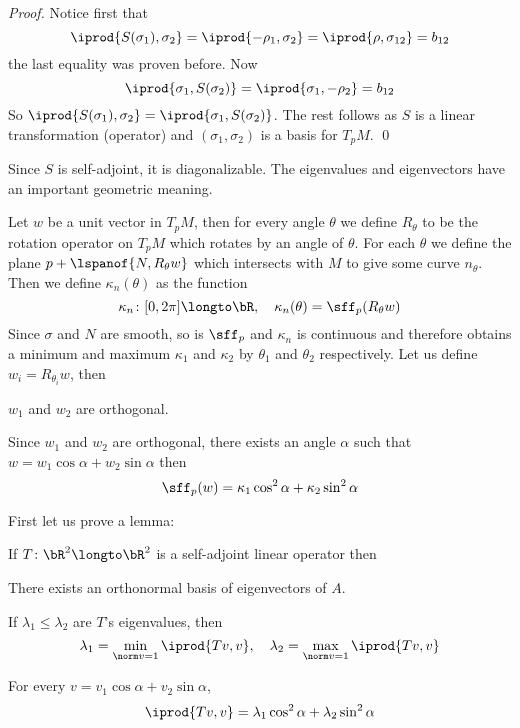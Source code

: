 \begin{proof}

    Notice first that
    \[ \iprod{S(\sigma_1),\sigma_2} = \iprod{-\rho_1,\sigma_2} = \iprod{\rho,\sigma_{12}} = b_{12} \]
    the last equality was proven before.
    Now
    \[ \iprod{\sigma_1,S(\sigma_2)} = \iprod{\sigma_1,-\rho_2} = b_{12} \]
    So $\iprod{S(\sigma_1),\sigma_2}=\iprod{\sigma_1,S(\sigma_2)}$.
    The rest follows as $S$ is a linear transformation (operator) and $(\sigma_1,\sigma_2)$ is a basis for $T_pM$.
    \qed

\end{proof}

Since $S$ is self-adjoint, it is diagonalizable.
The eigenvalues and eigenvectors have an important geometric meaning.

\begin{thrm*}

    Let $w$ be a unit vector in $T_pM$, then for every angle $\theta$ we define $R_\theta$ to be the rotation operator on $T_pM$ which rotates by an angle of $\theta$.
    For each $\theta$ we define the plane $p+\lspanof{N,R_\theta w}$ which intersects with $M$ to give some curve $n_\theta$.
    Then we define $\kappa_n(\theta)$ as the function
    \[ \kappa_n\colon[0,2\pi]\longto\bR,\quad \kappa_n(\theta) = \sff_p(R_\theta w) \]
    Since $\sigma$ and $N$ are smooth, so is $\sff_p$ and $\kappa_n$ is continuous and therefore obtains a minimum and maximum $\kappa_1$ and $\kappa_2$ by $\theta_1$ and $\theta_2$ respectively.
    Let us define $w_i=R_{\theta_i}w$, then
    \benum
        \item $w_1$ and $w_2$ are orthogonal.
        \item Since $w_1$ and $w_2$ are orthogonal, there exists an angle $\alpha$ such that $w=w_1\cos\alpha+w_2\sin\alpha$ then
            \[ \sff_p(w) = \kappa_1\cos^2\alpha + \kappa_2\sin^2\alpha \]
    \eenum

\end{thrm*}

First let us prove a lemma:

\begin{lemm*}

    If $T\colon\bR^2\longto\bR^2$ is a self-adjoint linear operator then
    \benum
        \item There exists an orthonormal basis of eigenvectors of $A$.
        \item If $\lambda_1\leq\lambda_2$ are $T$'s eigenvalues, then
            \[ \lambda_1=\min_{\norm v=1}\iprod{Tv,v},\quad \lambda_2=\max_{\norm v=1}\iprod{Tv,v} \]
        \item For every $v=v_1\cos\alpha+v_2\sin\alpha$,
            \[ \iprod{Tv,v} = \lambda_1\cos^2\alpha + \lambda_2\sin^2\alpha \]
    \eenum

\end{lemm*}

